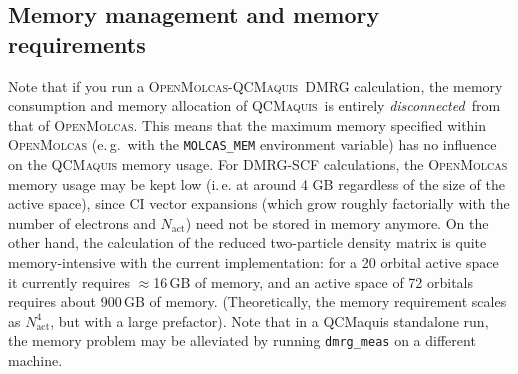 \documentclass[bibliography=totoc,12pt,a4paper]{scrartcl}
\newcommand{\mol}{\textsc{OpenMolcas}}
\newcommand{\qcm}{\textsc{QCMaquis}}
\begin{document}
\subsection{Memory management and memory requirements}\label{sec:memory-qcm}

Note that if you run a \mol-\qcm\ DMRG calculation, the memory consumption and memory allocation
of \qcm\ is entirely \emph{disconnected}\ from that of \mol. This means that the maximum memory specified within \mol{} (e.\,g.\ with the \texttt{MOLCAS\_MEM} environment variable) has no influence on the \qcm{} memory usage. For DMRG-SCF calculations, the \mol{} memory usage may be kept low (i.\,e. at around 4 GB regardless of the size of the active space), since CI vector expansions (which grow roughly factorially with the number of electrons and $N_\text{act}$) need not be stored in memory anymore. On the other hand, the calculation of the reduced two-particle density matrix is quite memory-intensive with the current implementation: for a 20 orbital active space it currently requires $\approx$16\,GB of memory, and an active space of 72 orbitals requires about 900\,GB of memory. (Theoretically, the memory requirement scales as $N_\text{act}^4$, but with a large prefactor). Note that in a QCMaquis standalone run, the memory problem may be alleviated by running \texttt{dmrg\_meas} on a different machine.
\end{document}
